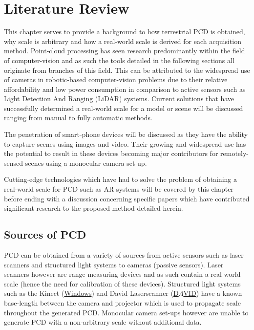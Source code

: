 
\chapter{Literature Review} %
\label{Chapter2}

This chapter serves to provide a background to how terrestrial PCD is obtained, why scale is arbitrary and how a real-world scale is derived for each acquisition method. Point-cloud processing has seen research predominantly within the field of computer-vision and as such the tools detailed in the following sections all originate from branches of this field. This can be attributed to the widespread use of cameras in robotic-based computer-vision problems due to their relative affordability and low power consumption in comparison to active sensors such as Light Detection And Ranging (LiDAR) systems. Current solutions that have successfully determined a real-world scale for a model or scene will be discussed ranging from manual to fully automatic methods.

The penetration of smart-phone devices will be discussed as they have the ability to capture scenes using images and video. Their growing and widespread use \citep{goldstein_report:_2014} has the potential to result in these devices becoming major contributors for remotely-sensed scenes using a monocular camera set-up. 

Cutting-edge technologies which have had to solve the problem of obtaining a real-world scale for PCD such as AR systems will be covered by this chapter before ending with a discussion concerning specific papers which have contributed significant research to the proposed method detailed herein. 

\section{Sources of PCD\label{SourcePCD}}
PCD can be obtained from a variety of sources from active sensors such as laser scanners and structured light systems to cameras (passive sensors). Laser scanners however are range measuring devices and as such contain a real-world scale (hence the need for calibration of these devices). Structured light systems such as the Kinect (\href{https://dev.windows.com/en-us/kinect}{Windows\textsuperscript{\textregistered}}) and David Laserscanner (\href{http://www.david-3d.com/en/}{D$\Lambda$VID\textsuperscript{\textregistered}}) have a known base-length between the camera and projector which is used to propagate scale throughout the generated PCD. Monocular camera set-ups however are unable to generate PCD with a non-arbitrary scale without additional data. 


